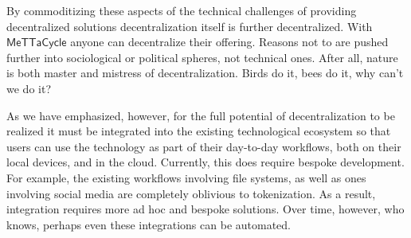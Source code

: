 \documentclass{article}
\newcommand{\MC}{\mathsf{MeTTaCycle}}
\begin{document}
By commoditizing these aspects of the technical challenges of
providing decentralized solutions decentralization itself is further
decentralized. With $\MC$ anyone can decentralize their
offering. Reasons not to are pushed further into sociological or
political spheres, not technical ones. After all, nature is both
master and mistress of decentralization. Birds do it, bees do it, why
can't we do it?

As we have emphasized, however, for the full potential of
decentralization to be realized it must be integrated into the
existing technological ecosystem so that users can use the technology
as part of their day-to-day workflows, both on their local devices, and in
the cloud. Currently, this does require bespoke development. For
example, the existing workflows involving file systems, as well as
ones involving social media are completely oblivious to
tokenization. As a result, integration requires more ad hoc and
bespoke solutions. Over time, however, who knows, perhaps even these
integrations can be automated.
\end{document}
